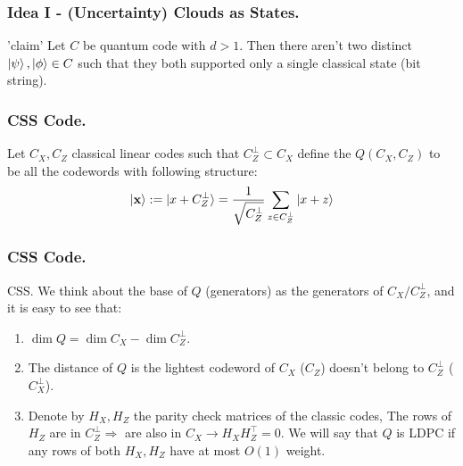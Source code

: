 \documentclass[usenames, aspectratio=169]{beamer}
\theoremstyle{claim}
\theoremstyle{remark}
\begin{document}
\begin{frame}
  \frametitle{ Idea I - (Uncertainty) Clouds as States. }
  \begin{block}{'claim'}
    Let $C$ be quantum code with $d>1$. Then there aren't two distinct $\ket{\psi},\ket{\phi}\in C$ such that they both supported only a single classical state (bit string).   
  \end{block}
\end{frame}
\begin{frame}
  \frametitle{ CSS Code.  }
\begin{definition}
  Let $C_{X}, C_{Z}$ classical linear codes such that $C_{Z}^{\perp} \subset C_{X}$ define the $Q\left( C_{X},C_{Z} \right)$ to be all the codewords with following structure:
  \begin{equation*}
    \begin{split}
    \ket { \mathbf{ x } } := \ket { x + C_{Z}^{\perp} } = \frac{1}{\sqrt{C_{Z}^{\perp}}} \sum_{z \in C_{Z}^{\perp}}{ \ket{ x + z }} 
    \end{split}
  \end{equation*}
\end{definition}

\end{frame}
\begin{frame}
  \frametitle{ CSS Code.  }
  \begin{block}{CSS.}
    We think about the base of $Q$ (generators) as the generators of $C_{X}/C_{Z}^{\perp}$, and it is easy to see that: 
    \begin{enumerate}
      \item $\dim Q = \dim C_{X} - \dim C_{Z}^{\perp}$.
      \item The distance of $Q$ is the lightest codeword of $C_{X}$ ($C_{Z}$) doesn't belong to $C_{Z}^{\perp}$ ($C_{X}^{\perp}$). 
      \item Denote by $H_{X},H_{Z}$ the parity check matrices of the classic codes, The rows of $H_{Z}$ are in $C_{Z}^{\perp} \Rightarrow $ are also in $C_{X} \rightarrow H_{X}H_{Z}^{\top} =0$. We will say that $Q$ is LDPC if any rows of both $H_{X},H_{Z}$ have at most $O(1)$ weight. 
    \end{enumerate}
  \end{block}
\end{frame}
\end{document}
